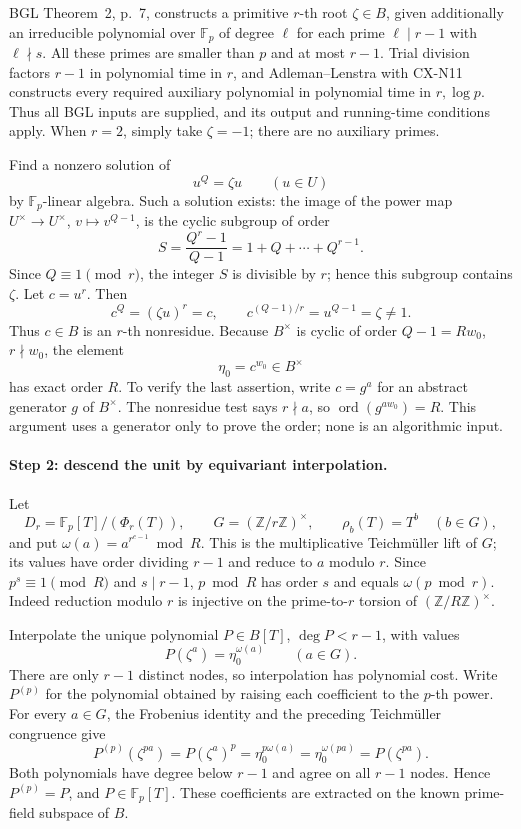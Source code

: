 \documentclass[11pt,a4paper]{article}
\begin{document}
BGL Theorem~2, p.~7, constructs a primitive \(r\)-th root
\(\zeta\in B\), given additionally an irreducible polynomial
over \(\mathbb F_p\) of degree \(\ell\) for each prime
\(\ell\mid r-1\) with \(\ell\nmid s\).
All these primes are smaller than \(p\) and at most \(r-1\).
Trial division factors \(r-1\) in polynomial time in \(r\),
and Adleman--Lenstra with CX-N11 constructs every required
auxiliary polynomial in polynomial time in \(r,\log p\).
Thus all BGL inputs are supplied, and its output and running-time
conditions apply. When \(r=2\), simply take \(\zeta=-1\);
there are no auxiliary primes.

Find a nonzero solution of
\[
 u^Q=\zeta u\qquad (u\in U)
\]
by \(\mathbb F_p\)-linear algebra.
Such a solution exists: the image of the power map
\(U^\times\to U^\times\), \(v\mapsto v^{Q-1}\), is the
cyclic subgroup of order
\[
 S=\frac{Q^r-1}{Q-1}=1+Q+\cdots+Q^{r-1}.
\]
Since \(Q\equiv1\pmod r\), the integer \(S\) is divisible
by \(r\); hence this subgroup contains \(\zeta\).
Let \(c=u^r\). Then
\[
 c^Q=(\zeta u)^r=c,
 \qquad c^{(Q-1)/r}=u^{Q-1}=\zeta\ne1.
\]
Thus \(c\in B\) is an \(r\)-th nonresidue.
Because \(B^\times\) is cyclic of order \(Q-1=R w_0\),
\(r\nmid w_0\), the element
\[
 \eta_0=c^{w_0}\in B^\times
\]
has exact order \(R\).
To verify the last assertion, write \(c=g^a\) for an abstract
generator \(g\) of \(B^\times\).
The nonresidue test says \(r\nmid a\), so
\(\operatorname{ord}(g^{a w_0})=R\).
This argument uses a generator only to prove the order; none is
an algorithmic input.

\paragraph{Step 2: descend the unit by equivariant interpolation.}
Let
\[
 D_r=\mathbb F_p[T]/(\Phi_r(T)),\qquad
 G=(\mathbb Z/r\mathbb Z)^\times,
 \qquad \rho_b(T)=T^b\quad(b\in G),
\]
and put \(\omega(a)=a^{r^{e-1}}\bmod R\).
This is the multiplicative Teichm\"uller lift of \(G\); its
values have order dividing \(r-1\) and reduce to \(a\) modulo
\(r\).
Since \(p^s\equiv1\pmod R\) and \(s\mid r-1\),
\(p\bmod R\) has order \(s\) and equals
\(\omega(p\bmod r)\).
Indeed reduction modulo \(r\) is injective on the
prime-to-\(r\) torsion of \((\mathbb Z/R\mathbb Z)^\times\).

Interpolate the unique polynomial \(P\in B[T]\),
\(\deg P<r-1\), with values
\[
 P(\zeta^a)=\eta_0^{\omega(a)}\qquad(a\in G).
\]
There are only \(r-1\) distinct nodes, so interpolation has
polynomial cost.
Write \(P^{(p)}\) for the polynomial obtained by raising each
coefficient to the \(p\)-th power.
For every \(a\in G\), the Frobenius identity and the preceding
Teichm\"uller congruence give
\[
 P^{(p)}(\zeta^{pa})
   =P(\zeta^a)^p
   =\eta_0^{p\omega(a)}
   =\eta_0^{\omega(pa)}
   =P(\zeta^{pa}).
\]
Both polynomials have degree below \(r-1\) and agree on all
\(r-1\) nodes. Hence \(P^{(p)}=P\), and
\(P\in\mathbb F_p[T]\).
These coefficients are extracted on the known prime-field
subspace of \(B\).
\end{document}
